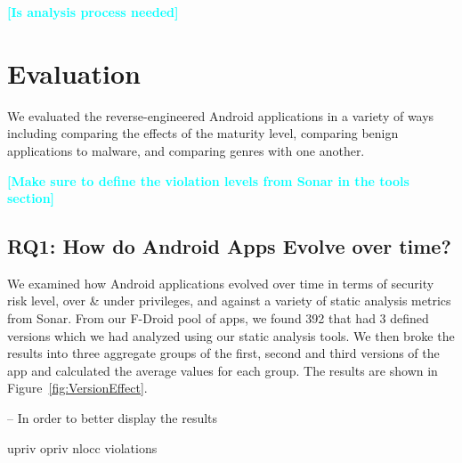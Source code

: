 \documentclass[conference]{IEEEtran}
\newcommand{\todo}[1]{\textcolor{cyan}{\textbf{[#1]}}}
\begin{document}
\todo{Is analysis process needed}


\section{Evaluation}
\label{sec: evaluation}


We evaluated the reverse-engineered Android applications in a variety of ways including comparing the effects of the maturity level, comparing benign applications to malware, and comparing genres with one another.


\todo{Make sure to define the violation levels from Sonar in the tools section}
\subsection{RQ1: How do Android Apps Evolve over time?}



We examined how Android applications evolved over time in terms of security risk level, over \& under privileges, and against a variety of static analysis metrics from Sonar. From our F-Droid pool of apps, we found 392 that had 3 defined versions which we had analyzed using our static analysis tools. We then broke the results into three aggregate groups of the first, second and third versions of the app and calculated the average values for each group. The results are shown in Figure~\ref{fig:VersionEffect}.


-- In order to better display the results



upriv
opriv
nlocc
violations
\end{document}
